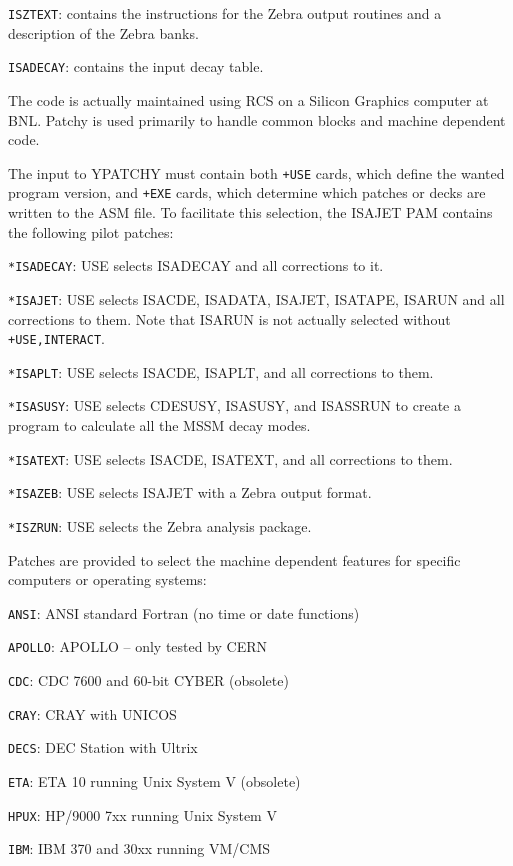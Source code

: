       \verb|ISZTEXT|: contains the instructions for the Zebra output
routines and a description of the Zebra banks.

      \verb|ISADECAY|: contains the input decay table.

      The code is actually maintained using RCS on a Silicon Graphics
computer at BNL. Patchy is used primarily to handle common blocks and
machine dependent code.

      The input to YPATCHY must contain both \verb|+USE| cards, which
define the wanted program version, and \verb|+EXE| cards, which
determine which patches or decks are written to the ASM file. To
facilitate this selection, the ISAJET PAM contains the following pilot
patches:

      \verb|*ISADECAY|: USE selects ISADECAY and all corrections to it.

      \verb|*ISAJET|: USE selects ISACDE, ISADATA, ISAJET, ISATAPE,
ISARUN and all corrections to them. Note that ISARUN is not actually
selected without \verb|+USE,INTERACT|.

      \verb|*ISAPLT|: USE selects ISACDE, ISAPLT, and all corrections
to them.

      \verb|*ISASUSY|: USE selects CDESUSY, ISASUSY, and ISASSRUN to
create a program to calculate all the MSSM decay modes.

      \verb|*ISATEXT|: USE selects ISACDE, ISATEXT, and all corrections
to them. 

      \verb|*ISAZEB|: USE selects ISAJET with a Zebra output format.

      \verb|*ISZRUN|: USE selects the Zebra analysis package.

      Patches are provided to select the machine dependent features for
specific computers or operating systems:

      \verb|ANSI|: ANSI standard Fortran (no time or date functions)

      \verb|APOLLO|: APOLLO -- only tested by CERN

      \verb|CDC|: CDC 7600 and 60-bit CYBER (obsolete)

      \verb|CRAY|: CRAY with UNICOS

      \verb|DECS|: DEC Station with Ultrix 

      \verb|ETA|: ETA 10 running Unix System V (obsolete)

      \verb|HPUX|: HP/9000 7xx running Unix System V

      \verb|IBM|: IBM 370 and 30xx running VM/CMS 

